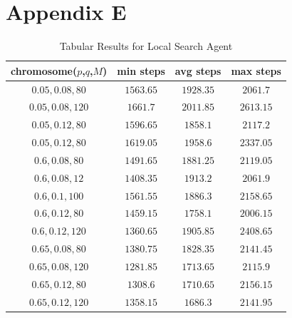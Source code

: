 \documentclass[letterpaper]{article} %
\begin{document}
  \section{Appendix E}
  \begin{table}[h!]
    \centering
    \normalsize{
      \begin{spacing}{1.9}
      \begin{tabular}{ |cccc| } 
        \hline
        chromosome($p$,$q$,$M$) & min steps & avg steps & max steps  \\ 
        \hline
        \hline
        $0.05, 0.08, 80$  & $1563.65$       & $1928.35$        & $2061.7$\\
        $0.05, 0.08, 120$ & $1661.7$        & $2011.85$        & $2613.15$\\
        $0.05, 0.12, 80$  & $1596.65$       & $1858.1$         & $2117.2$\\
        $0.05, 0.12, 80$  & $1619.05$       & $1958.6$         & $2337.05$\\
        $0.6, 0.08, 80$   & $1491.65$         & $1881.25$      & $2119.05$\\
        $0.6, 0.08, 12$   & $1408.35$         & $1913.2$       & $2061.9$\\
        $0.6, 0.1, 100$   & $1561.55$         & $1886.3$       & $2158.65$\\
        $0.6, 0.12, 80$   & $1459.15$         & $1758.1$       & $2006.15$\\
        $0.6, 0.12, 120$  & $1360.65$         & $1905.85$      & $2408.65$\\
        $0.65, 0.08, 80$  & $1380.75$         & $1828.35$      & $2141.45$\\
        $0.65, 0.08, 120$ & $1281.85$         & $1713.65$      & $2115.9$\\
        $0.65, 0.12, 80$  & $1308.6$         & $1710.65$       & $2156.15$\\
        $0.65, 0.12, 120$ & $1358.15$         & $1686.3$       & $2141.95$ \\ 
        \hline
      \end{tabular}
    \end{spacing}
    }
    \caption{Tabular Results for Local Search Agent}
    \label{tab:tabularResultGA}
  \end{table}  
  \newpage
\end{document}
